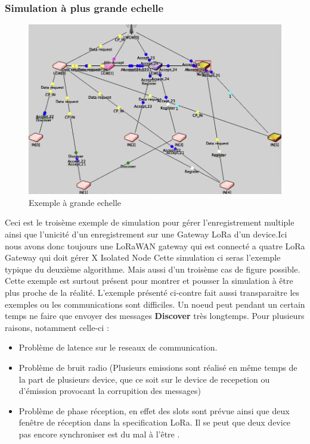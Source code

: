\documentclass[11pt]{article}
\begin{document}
\subsubsection{Simulation à plus grande echelle }
\begin{figure}[!ht]
\centering
\includegraphics[scale=0.45]{fat.png} 
\caption{Exemple à grande echelle}
\end{figure}
Ceci est le troisème exemple de simulation pour gérer l'enregistrement multiple ainsi que l'unicité d'un enregistrement sur une Gateway LoRa d'un device.Ici nous avons donc toujours une LoRaWAN gateway qui est connecté a quatre LoRa Gateway qui doit gérer X Isolated Node Cette simulation ci seras l'exemple typique du deuxième algorithme. Mais aussi d'un troisème cas de figure possible. Cette exemple est surtout présent pour montrer et pousser la simulation à être plus proche de la réalité.
L'exemple présenté ci-contre fait aussi transparaitre les exemples ou les communications sont difficiles. Un noeud peut pendant un certain temps ne faire que envoyer des messages \textbf{Discover} très longtemps. Pour plusieurs raisons, notamment celle-ci : 
\begin{itemize}
\item Problème de latence sur le reseaux de communication. 
\item Problème de bruit radio (Plusieurs emissions sont réalisé en même temps de la part de plusieurs device, que ce soit sur le device de recepetion ou d'émission provocant la corrupition des messages)
\item Problème de phase réception, en effet des slots sont prévue ainsi que deux fenêtre de réception dans la specification LoRa. Il se peut que deux device pas encore synchroniser est du mal à l'être .
\end{itemize}
\newpage
\end{document}
